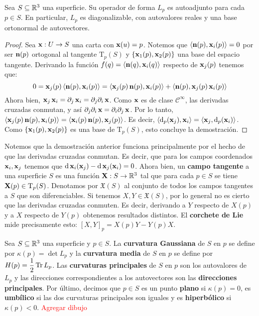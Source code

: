 \begin{prop}
Sea $S\subseteq\RR^3$ una superficie. Su operador de forma $L_p$ es autoadjunto para cada $p\in S$. En particular, $L_p$ es diagonalizable, con autovalores reales y una base ortonormal de autovectores.
\begin{proof}
Sea $\x:U\to S$ una carta con $\x(u)=p$. Notemos que $\pint{\n(p),\x_i(p)}=0$ por ser $\n(p)$ ortogonal al tangente $\mathrm{T}_p(S)$ y $\{\x_1(p),\x_2(p)\}$ una base del espacio tangente. Derivando la función $f(q)=\pint{\n(q),\x_i(q)}$ respecto de $\x_j(p)$ tenemos que: $$0 = \x_j(p)\pint{\n(p),\x_i(p)} = \pint{\x_j(p)\n(p),\x_i(p)} + \pint{\n(p),\x_j(p)\x_i(p)}$$ Ahora bien, $\x_j\x_i=\partial_j\x_i=\partial_j\partial_i\x$. Como $\x$ es de clase $\mathscr{C}^\infty$, las derivadas cruzadas conmutan, y así $\partial_j\partial_i\x = \partial_i\partial_j\x$. Por lo tanto, $\pint{\x_j(p)\n(p),\x_i(p)} = \pint{\x_i(p)\n(p),\x_j(p)}$. Es decir, $\pint{\diff_p(\x_j),\x_i} = \pint{\x_j,\diff_p(\x_i)}$. Como $\{\x_1(p),\x_2(p)\}$ es una base de $\mathrm{T}_p(S)$, esto concluye la demostración.
\end{proof}
\end{prop}

Notemos que la demostración anterior funciona principalmente por el hecho de que las derivadas cruzadas conmutan. Es decir, que para los campos coordenados $\x_i,\x_j$ tenemos que $\diff\x_i(\x_j) - \diff\x_j(\x_i)=0$. Ahora bien, un \textbf{campo tangente} a una superficie $S$ es una función $\X:S\to\RR^3$ tal que para cada $p\in S$ se tiene $\X(p)\in\mathrm{T}_p(S)$. Denotamos por $\mathfrak{X}(S)$ al conjunto de todos los campos tangentes a $S$ que son diferenciables. Si tenemos $X,Y\in\mathfrak{X}(S)$, por lo general no es cierto que las derivadas cruzadas conmuten. Es decir, derivando a $Y$ respecto de $X(p)$ y a $X$ respecto de $Y(p)$ obtenemos resultados distintos. El \textbf{corchete de Lie} mide precisamente esto: $[X,Y]_p=X(p)Y-Y(p)X$.

\begin{defn}
Sea $S\subseteq\RR^3$ una superficie y $p\in S$. La \textbf{curvatura Gaussiana} de $S$ en $p$ se define por $\kappa(p)=\det L_p$ y la \textbf{curvatura media} de $S$ en $p$ se define por $H(p)=\dfrac{1}{2}\tr L_p$. Las \textbf{curvaturas principales} de $S$ en $p$ son los autovalores de $L_p$ y las direcciones correspondientes a los autovectores son las \textbf{direcciones principales}. Por último, decimos que $p\in S$ es un punto \textbf{plano} si $\kappa(p)=0$, es \textbf{umbílico} si las dos curvaturas principales son iguales y es \textbf{hiperbólico} si $\kappa(p)<0$. \textcolor{red}{Agregar dibujo}
\end{defn}


